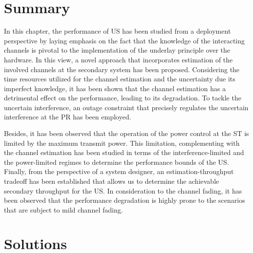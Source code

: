 \section{Summary} \label{sec_US:conc}
In this chapter, the performance of US has been studied from a deployment perspective by laying emphasis on the fact that the knowledge of the interacting channels is pivotal to the implementation of the underlay principle over the hardware. In this view, a novel approach that incorporates estimation of the involved channels at the secondary system has been proposed. Considering the time resources utilized for the channel estimation and the uncertainty due its imperfect knowledge, it has been shown that the channel estimation has a detrimental effect on the performance, leading to its degradation. To tackle the uncertain interference, an outage constraint that precisely regulates the uncertain interference at the PR has been employed. 

Besides, it has been observed that the operation of the power control at the ST is limited by the maximum transmit power. This limitation, complementing with the channel estimation has been studied in terms of the interference-limited and the power-limited regimes to determine the performance bounds of the US. %
Finally, from the perspective of a system designer, an estimation-throughput tradeoff has been established that allows us to determine the achievable secondary throughput for the US. In consideration to the channel fading, it has been observed that the performance degradation is highly prone to the scenarios that are subject to mild channel fading. 

\section{Solutions}

